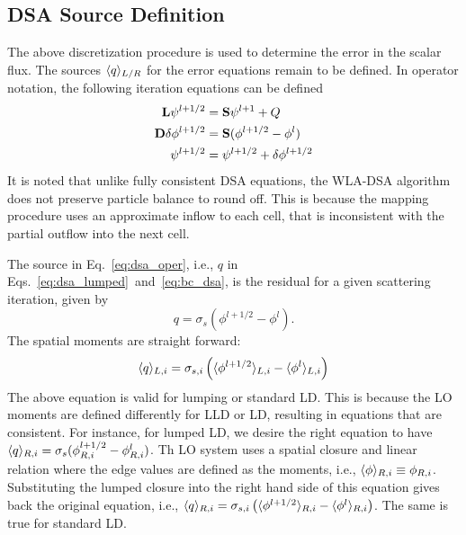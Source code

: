 \subsection{DSA Source Definition}

The above discretization procedure is used to determine the error in the scalar flux.
The sources $\langle q \rangle_{L/R}$ for the error equations remain to be defined.  In operator
notation, the following
iteration equations can be defined
\begin{align}
    \mathbf{L} \psi^{l+1/2} &= \mathbf{S} \psi^{l+1} + Q \\
    \mathbf{D} \delta \phi^{l+1/2} &= \mathbf{S} (\phi^{l+1/2} - \phi^{l}) \label{eq:dsa_oper} \\
     \psi^{l+1/2} &= \mathbf{\psi}^{l+1/2} + \delta \mathbf{\phi}^{l+1/2}
\end{align}
It is noted that unlike fully consistent DSA equations, the WLA-DSA algorithm does not
preserve particle balance to round off.  This is because the mapping procedure uses an
approximate inflow to each cell, that is inconsistent with the partial outflow into the
next cell.

The source in Eq.~\eqref{eq:dsa_oper}, i.e., $q$ in
Eqs.~\eqref{eq:dsa_lumped}~and~\eqref{eq:bc_dsa}, is the residual for a given scattering iteration,
given by~\cite{morel_dsa,lewis}
\begin{equation}
    q = \sigma_s\left(\phi^{l+1/2} - \phi^{l}\right).
\end{equation}
The spatial moments are straight forward:
\begin{equation}
    \langle q \rangle_{L,i} = \sigma_{s,i}\left(\langle \phi^{l+1/2} \rangle_{L,i} -
    \langle \phi^{l} \rangle_{L,i}\right)
\end{equation}
The above equation is valid for lumping or standard LD.  This is because the LO
moments are defined differently for LLD or LD, resulting in equations that are
consistent.  For instance, for lumped LD, we desire the right equation to have $\langle q \rangle_{R,i} =
\sigma_s(\phi^{l+1/2}_{R,i} - \phi^{l}_{R,i})$.   Th LO system uses a spatial closure and
linear relation where the edge values are defined as the moments, i.e., $\langle \phi \rangle_{R,i} \equiv \phi_{R,i}$.
Substituting the lumped closure into
the right hand side of this equation gives back the original equation, i.e., $\langle q \rangle_{R,i} = \sigma_{s,i}\left(\langle \phi^{l+1/2} \rangle_{R,i} -
    \langle \phi^{l} \rangle_{R,i}\right) $.  The same is true for standard LD.

